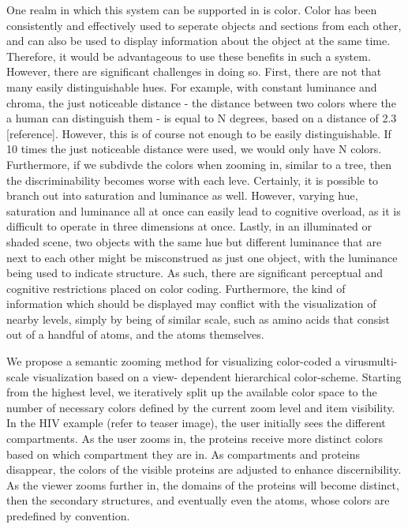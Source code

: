 \documentclass[review,journal]{vgtc}         %
\begin{document}
One realm in which this system can be supported in is color. Color has been consistently and effectively used to seperate objects and sections from each other, and can also be used to display information about the object at the same time. 
Therefore, it would be advantageous to use these benefits in such a system. 
However, there are significant challenges in doing so. First, there are not that many easily distinguishable hues. 
For example, with constant luminance and chroma, the just noticeable distance - the distance between two colors where the a human can distinguish them - is equal to N degrees, based on a distance of 2.3 [reference]. However, this is of course not enough to be easily distinguishable. If 10 times the just noticeable distance were used, we would only have N colors. Furthermore, if we subdivde the colors when zooming in, similar to a tree, then the discriminability becomes worse with each leve. Certainly, it is possible to branch out into saturation and luminance as well. However, varying hue, saturation and luminance all at once can easily lead to cognitive overload, as it is difficult to operate in three dimensions at once. Lastly, in an illuminated or shaded scene, two objects with the same hue but different luminance that are next to each other might be misconstrued as just one object, with the luminance being used to indicate structure. As such, there are significant perceptual and cognitive restrictions placed on color coding. Furthermore, the kind of information which should be displayed may conflict with the visualization of nearby levels, simply by being of similar scale, such as amino acids that consist out of a handful of atoms, and the atoms themselves.



We propose a semantic zooming method for visualizing color-coded a virusmulti-scale visualization based on a view- dependent hierarchical color-scheme. Starting from the highest level, we iteratively split up the available color space to the number of necessary colors defined by the current zoom level and item visibility.
In the HIV example (refer to teaser image), the user initially sees the different compartments. 
As the user zooms in, the proteins receive more distinct colors based on which compartment they are in. As compartments and proteins disappear, the colors of the visible proteins are adjusted to enhance discernibility.  
As the viewer zooms further in, the domains of the proteins will become distinct, then the secondary structures, and eventually even the atoms, whose colors are predefined by convention. 
\end{document}
